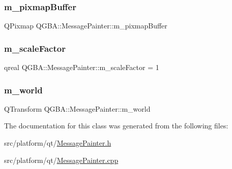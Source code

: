 \subsubsection{\texorpdfstring{m\+\_\+pixmap\+Buffer}{m\_pixmapBuffer}}
{\footnotesize\ttfamily Q\+Pixmap Q\+G\+B\+A\+::\+Message\+Painter\+::m\+\_\+pixmap\+Buffer\hspace{0.3cm}{\ttfamily [private]}}

\mbox{\label{class_q_g_b_a_1_1_message_painter_ae0c3e8dff872aff6df2ef537f4ecf3ce}} 
\subsubsection{\texorpdfstring{m\+\_\+scale\+Factor}{m\_scaleFactor}}
{\footnotesize\ttfamily qreal Q\+G\+B\+A\+::\+Message\+Painter\+::m\+\_\+scale\+Factor = 1\hspace{0.3cm}{\ttfamily [private]}}

\mbox{\label{class_q_g_b_a_1_1_message_painter_ab7772ab3f76e81bcb6a45a9850f31944}} 
\subsubsection{\texorpdfstring{m\+\_\+world}{m\_world}}
{\footnotesize\ttfamily Q\+Transform Q\+G\+B\+A\+::\+Message\+Painter\+::m\+\_\+world\hspace{0.3cm}{\ttfamily [private]}}



The documentation for this class was generated from the following files\+:\begin{DoxyCompactItemize}
\item 
src/platform/qt/\mbox{\hyperlink{_message_painter_8h}{Message\+Painter.\+h}}\item 
src/platform/qt/\mbox{\hyperlink{_message_painter_8cpp}{Message\+Painter.\+cpp}}\end{DoxyCompactItemize}
